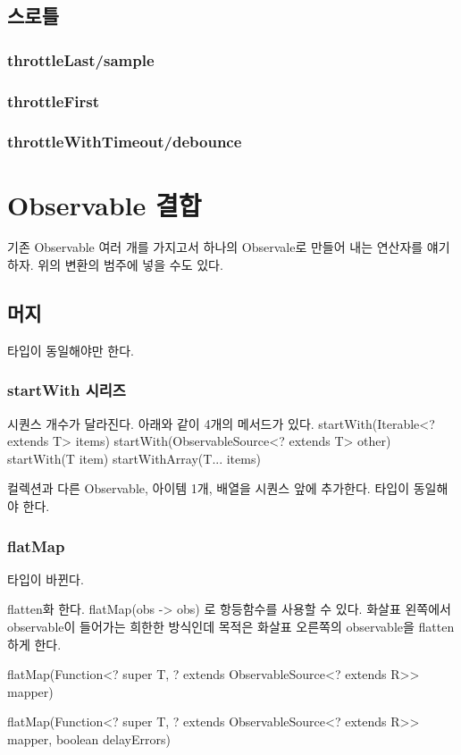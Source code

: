 \documentclass{book}
\begin{document}
{\subsection{스로틀}
\subsubsection{throttleLast/sample}

\subsubsection{throttleFirst}

\subsubsection{throttleWithTimeout/debounce}

\section{Observable 결합}
기존 Observable 여러 개를 가지고서 하나의 Observale로 만들어 내는 연산자를 얘기하자.
위의 변환의 범주에 넣을 수도 있다.

\subsection{머지}
타입이 동일해야만 한다.
\subsubsection{startWith 시리즈}
시퀀스 개수가 달라진다. 아래와 같이 4개의 메서드가 있다. 
startWith(Iterable<? extends T> items)
startWith(ObservableSource<? extends T> other)
startWith(T item)
startWithArray(T... items) 

컬렉션과 다른 Observable, 아이템 1개, 배열을 시퀀스 앞에 추가한다.
타입이 동일해야 한다.

\subsubsection{flatMap}
타입이 바뀐다.

flatten화 한다. 
flatMap(obs -> obs) 로 항등함수를 사용할 수 있다.
화살표 왼쪽에서 observable이 들어가는 희한한 방식인데 목적은 화살표 오른쪽의 observable을 flatten하게 한다.

flatMap(Function<? super T, ? extends ObservableSource<? extends R>> mapper)

flatMap(Function<? super T, ? extends ObservableSource<? extends R>> mapper, boolean delayErrors)

}
\end{document}
